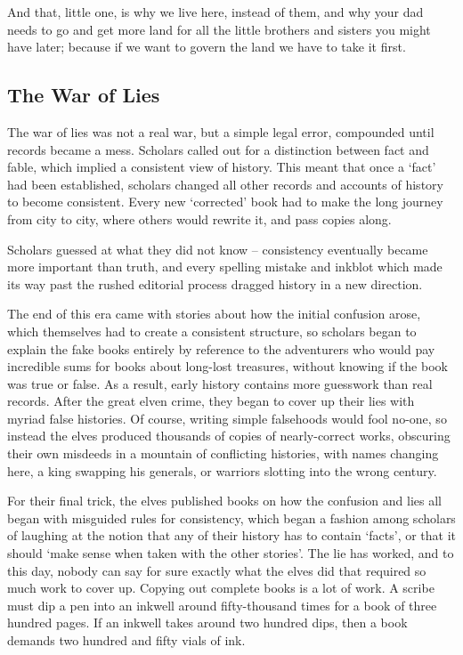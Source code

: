 \begin{multicols}{2}
\begin{exampletext}
  And that, little one, is why we live here, instead of them, and why your dad needs to go and get more land for all the little brothers and sisters you might have later; because if we want to govern the land we have to take it first.
\fi

\end{exampletext}

\subsection{The War of Lies}
\label{warOfLies}

\randomfour
\begin{exampletext}
  \ifcase\value{r4}\relax\or
    The war of lies was not a real war, but a simple legal error, compounded until records became a mess.
    Scholars called out for a distinction between fact and fable, which implied a consistent view of history.
    This meant that once a `fact' had been established, scholars changed all other records and accounts of history to become consistent.
    Every new `corrected' book had to make the long journey from city to city, where others would rewrite it, and pass copies along.

    Scholars guessed at what they did not know -- consistency eventually became more important than truth, and every spelling mistake and inkblot which made its way past the rushed editorial process dragged history in a new direction.

    The end of this era came with stories about how the initial confusion arose, which themselves had to create a consistent structure, so scholars began to explain the fake books entirely by reference to the adventurers who would pay incredible sums for books about long-lost treasures, without knowing if the book was true or false.
    As a result, early history contains more guesswork than real records.
  \or
    After the great elven crime, they began to cover up their lies with myriad false histories.
    Of course, writing simple falsehoods would fool no-one, so instead the elves produced thousands of copies of nearly-correct works, obscuring their own misdeeds in a mountain of conflicting histories, with names changing here, a king swapping his generals, or warriors slotting into the wrong century.

    For their final trick, the elves published books on how the confusion and lies all began with misguided rules for consistency, which began a fashion among scholars of laughing at the notion that any of their history has to contain `facts', or that it should `make sense when taken with the other stories'.
    The lie has worked, and to this day, nobody can say for sure exactly what the elves did that required so much work to cover up.
  \or
  Copying out complete books is a lot of work.
  A scribe must dip a pen into an inkwell around fifty-thousand times for a book of three hundred pages.
  If an inkwell takes around two hundred dips, then a book demands two hundred and fifty vials of ink.


\end{exampletext}
\end{multicols}
